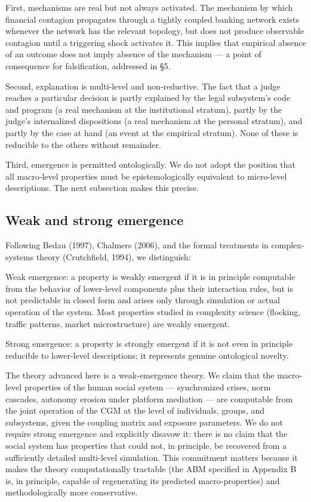 \documentclass[12pt,a4paper]{article}
\begin{document}
First, mechanisms are real but not always activated. The mechanism by which financial contagion propagates through a tightly coupled banking network exists whenever the network has the relevant topology, but does not produce observable contagion until a triggering shock activates it. This implies that empirical absence of an outcome does not imply absence of the mechanism --- a point of consequence for falsification, addressed in §5.


Second, explanation is multi-level and non-reductive. The fact that a judge reaches a particular decision is partly explained by the legal subsystem's code and program (a real mechanism at the institutional stratum), partly by the judge's internalized dispositions (a real mechanism at the personal stratum), and partly by the case at hand (an event at the empirical stratum). None of these is reducible to the others without remainder.


Third, emergence is permitted ontologically. We do not adopt the position that all macro-level properties must be epistemologically equivalent to micro-level descriptions. The next subsection makes this precise.

\subsection{Weak and strong emergence}

Following Bedau (1997), Chalmers (2006), and the formal treatments in complex-systems theory (Crutchfield, 1994), we distinguish:


Weak emergence: a property is weakly emergent if it is in principle computable from the behavior of lower-level components plus their interaction rules, but is not predictable in closed form and arises only through simulation or actual operation of the system. Most properties studied in complexity science (flocking, traffic patterns, market microstructure) are weakly emergent.

Strong emergence: a property is strongly emergent if it is not even in principle reducible to lower-level descriptions; it represents genuine ontological novelty.


The theory advanced here is a weak-emergence theory. We claim that the macro-level properties of the human social system --- synchronized crises, norm cascades, autonomy erosion under platform mediation --- are computable from the joint operation of the CGM at the level of individuals, groups, and subsystems, given the coupling matrix and exposure parameters. We do not require strong emergence and explicitly disavow it: there is no claim that the social system has properties that could not, in principle, be recovered from a sufficiently detailed multi-level simulation. This commitment matters because it makes the theory computationally tractable (the ABM specified in Appendix B is, in principle, capable of regenerating its predicted macro-properties) and methodologically more conservative.
\end{document}
